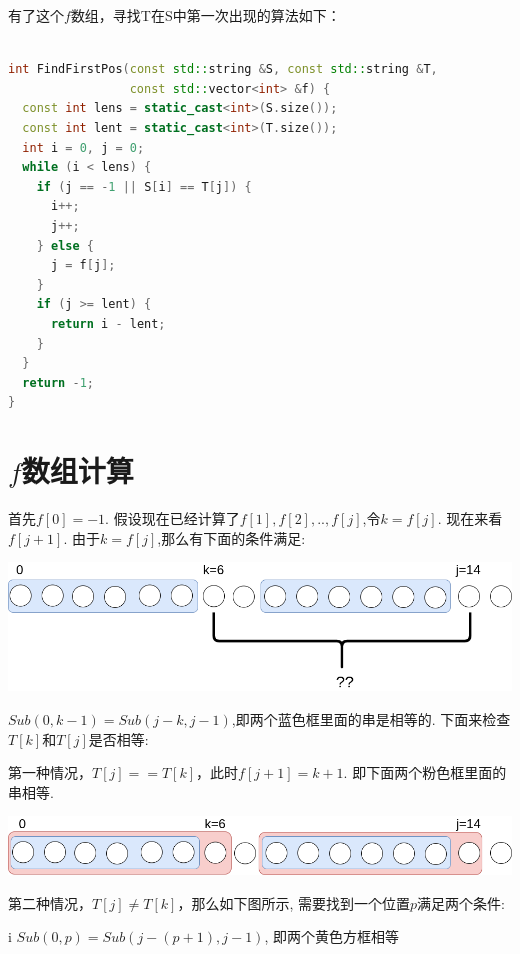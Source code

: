 \documentclass{article}
\begin{document}
有了这个$f$数组，寻找T在S中第一次出现的算法如下：\par
\begin{lstlisting}[language=C++, caption={FindFirstPos in S}]

int FindFirstPos(const std::string &S, const std::string &T,
                 const std::vector<int> &f) {
  const int lens = static_cast<int>(S.size());
  const int lent = static_cast<int>(T.size());
  int i = 0, j = 0;
  while (i < lens) {
    if (j == -1 || S[i] == T[j]) {
      i++;
      j++;
    } else {
      j = f[j];
    }
    if (j >= lent) {
      return i - lent;
    }
  }
  return -1;
}
\end{lstlisting}

\section{$f$数组计算}
首先$f[0]=-1$. 假设现在已经计算了$f[1],f[2],..,f[j]$,令$k=f[j]$. 现在来看$f[j+1]$. 由于$k=f[j]$,那么有下面的条件满足: \par
\includegraphics[scale=0.35]{pic3.png} \par
$Sub(0,k-1)=Sub(j-k,j-1)$,即两个蓝色框里面的串是相等的. 下面来检查$T[k]$和$T[j]$是否相等: \par
第一种情况，$T[j]==T[k]$，此时$f[j+1]=k+1$. 即下面两个粉色框里面的串相等. \par
\includegraphics[scale=0.35]{pic4.png} \par
第二种情况，$T[j] \neq T[k]$，那么如下图所示, 需要找到一个位置$p$满足两个条件: \par

i $Sub(0,p)=Sub(j-(p+1),j-1)$, 即两个黄色方框相等 \par
\end{document}

